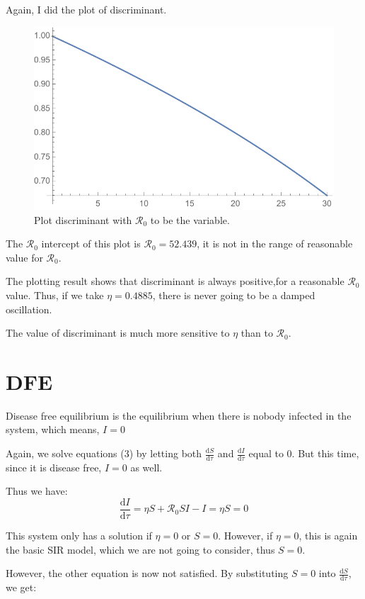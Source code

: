 \documentclass[12pt]{article}
\newcommand\dbyd[2]{\frac{\mathrm d{#1}}{\mathrm d{#2}}}
\newcommand{\R}{\mathcal{R}}
\begin{document}
Again, I did the plot of discriminant.

\begin{figure}[H]
  \caption{Plot discriminant with $\R_0$ to be the variable.}
  \includegraphics[width=1\textwidth]{Figures/Plot_R_S.pdf}
\end{figure}

The $\R_0$ intercept of this plot is $\R_0=52.439$, it is not in the range of reasonable value for $\R_0$.

The plotting result shows that discriminant is always positive,for a reasonable $\mathcal{R}_0$ value. Thus, if we take $\eta=0.4885$, there is never going to be a damped oscillation.

The value of discriminant is much more sensitive to $\eta$ than to $\mathcal{R}_0$.

\section{DFE}

Disease free equilibrium is the equilibrium when there is nobody infected in the system, which means, $I=0$

Again, we solve equations (3) by letting both $\dbyd{S}{\tau}$ and $\dbyd{I}{\tau}$ equal to 0. But this time, since it is disease free, $I=0$ as well.

Thus we have:
\begin{equation}
\dbyd{I}{\tau}=\eta S+\mathcal{R}_0 SI-I=\eta S=0
\end{equation}

This system only has a solution if $\eta=0$ or $S=0$. However, if $\eta=0$, this is again the basic SIR model, which we are not going to consider, thus $S=0$.

However, the other equation is now not satisfied. By substituting $S=0$ into $\dbyd{S}{\tau}$, we get:
\end{document}

